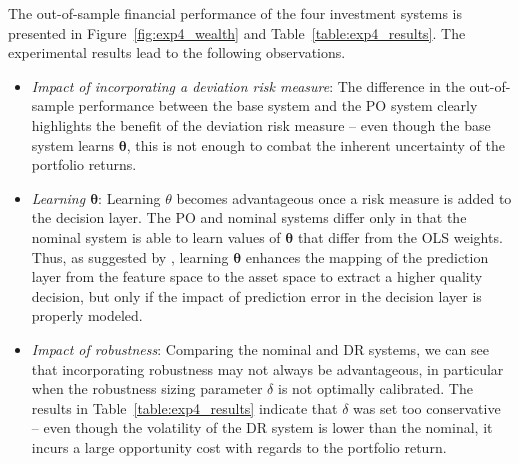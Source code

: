 \documentclass[10pt, twocolumn]{article}
\theoremstyle{plain}
\theoremstyle{definition}
\begin{document}
The out-of-sample financial performance of the four investment systems is 
presented in Figure~\ref{fig:exp4_wealth} and Table~\ref{table:exp4_results}. 
The experimental results lead to the following observations.

\begin{itemize}[itemsep=-0.15em, topsep=0pt, leftmargin=*]
  
\item \emph{Impact of incorporating a deviation risk measure}: The
  difference in the out-of-sample performance between the base system and 
  the PO system clearly highlights the benefit of the deviation risk 
  measure -- even though the base system learns \(\bm{\theta}\), this 
  is not enough to combat the inherent uncertainty of the portfolio 
  returns.

\item \emph{Learning \(\bm{\theta}\)}: Learning \(\theta\) becomes 
  advantageous once a risk measure is added to the decision layer. The 
  PO and nominal systems differ only in that the nominal system is able 
  to learn values of \(\bm{\theta}\) that differ from the OLS weights.
  Thus, as suggested by \citet{donti2017task}, learning \(\bm{\theta}\) 
  enhances the mapping of the prediction layer from the feature space to 
  the asset space to extract a higher quality decision, but only if the 
  impact of prediction error in the decision layer is properly modeled.

\item \emph{Impact of robustness}: Comparing the nominal and DR systems, 
  we can see that incorporating robustness may not always be advantageous, in 
  particular when the robustness sizing parameter \(\delta\) is not optimally 
  calibrated. The results in Table~\ref{table:exp4_results} indicate that 
  \(\delta\) was set too conservative -- even though the volatility of the DR 
  system is lower than the nominal, it incurs a large opportunity cost with 
  regards to the portfolio return.
  
\end{itemize}
\end{document}
